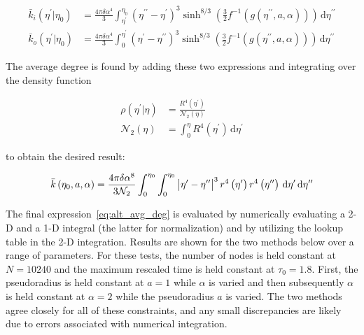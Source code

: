 \documentclass[preprint,notitlepage,amsmath,amssymb,floatfix]{revtex4-1}
\begin{document}
\begin{align}
\bar{k}_i\left(\eta^\prime|\eta_0\right) &= \frac{4\pi\delta\alpha^4}{3}\int_{\eta^\prime}^{\eta_0}\!\left(\eta^{\prime\prime}-\eta^\prime\right)^3\sinh^{8/3}\left(\frac{3}{2}f^{-1}\left(g\left(\eta^{\prime\prime}, a, \alpha\right)\right)\right)\,\mathrm d\eta^{\prime\prime} \\
\bar{k}_o\left(\eta^\prime|\eta_0\right) &= \frac{4\pi\delta\alpha^4}{3}\int_0^{\eta^\prime}\!\left(\eta^\prime-\eta^{\prime\prime}\right)^3\sinh^{8/3}\left(\frac{3}{2}f^{-1}\left(g\left(\eta^{\prime\prime}, a, \alpha\right)\right)\right)\,\mathrm d\eta^{\prime\prime}
\end{align}

\noindent The average degree is found by adding these two expressions and integrating over the density function

\begin{equation}
\begin{split}
\rho\left(\eta^\prime|\eta\right) &= \frac{R^4\left(\eta^\prime\right)}{\mathcal{N}_2\left(\eta\right)} \\
\mathcal{N}_2\left(\eta\right) &= \int_0^\eta\!R^4\left(\eta^\prime\right)\,\mathrm d\eta^\prime
\end{split}
\end{equation}

\noindent to obtain the desired result:

\begin{equation}
\label{eq:alt_avg_deg}
\bar{k}\left(\eta_0,a,\alpha\right) = \frac{4\pi\delta\alpha^8}{3\mathcal{N}_2}\int_0^{\eta_0}\int_0^{\eta_0}\,\abs{\eta^\prime - \eta^{\prime\prime}}^3 r^4\left(\eta^\prime\right)r^4\left(\eta^{\prime\prime}\right)\,\mathrm d\eta^\prime\,\mathrm d\eta^{\prime\prime}
\end{equation}

\noindent The final expression~\eqref{eq:alt_avg_deg} is evaluated by numerically evaluating a 2-D and a 1-D integral (the latter for normalization) and by utilizing the lookup table in the 2-D integration.
Results are shown for the two methods below over a range of parameters.
For these tests, the number of nodes is held constant at $N = 10240$ and the maximum rescaled time is held constant at $\tau_0 = 1.8$.
First, the pseudoradius is held constant at $a = 1$ while $\alpha$ is varied and then subsequently $\alpha$ is held constant at $\alpha = 2$ while the pseudoradius $a$ is varied.
The two methods agree closely for all of these constraints, and any small discrepancies are likely due to errors associated with numerical integration.
\end{document}
